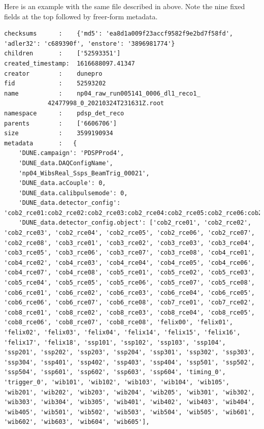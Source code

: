 \documentclass[../main-v1.tex]{subfiles}
\begin{document}
Here is an example with the same file described in  above. Note the nine fixed fields at the top followed by freer-form metadata. 

\begin{verbatim}
checksums      :    {'md5': 'ea8d1a009f23accf9582f9e2bd7f58fd', 'adler32': 'c689390f', 'enstore': '3896981774'}
children       :    ['52593351']
created_timestamp:  1616688097.41347
creator        :    dunepro
fid            :    52593202
name           :    np04_raw_run005141_0006_dl1_reco1_
            42477998_0_20210324T231631Z.root
namespace      :    pdsp_det_reco
parents        :    ['6606706']
size           :    3599190934
metadata       :   {
    'DUNE.campaign': 'PDSPProd4',
    'DUNE_data.DAQConfigName',
    'np04_WibsReal_Ssps_BeamTrig_00021',
    'DUNE_data.acCouple': 0,
    'DUNE_data.calibpulsemode': 0,
    'DUNE_data.detector_config': 'cob2_rce01:cob2_rce02:cob2_rce03:cob2_rce04:cob2_rce05:cob2_rce06:cob2_rce07:cob2_rce08:cob3_rce01:cob3_rce02:cob3_rce03:cob3_rce04:cob3_rce05:cob3_rce06:cob3_rce07:cob3_rce08:cob4_rce01:cob4_rce02:cob4_rce03:cob4_rce04:cob4_rce05:cob4_rce06:cob4_rce07:cob4_rce08:cob5_rce01:cob5_rce02:cob5_rce03:cob5_rce04:cob5_rce05:cob5_rce06:cob5_rce07:cob5_rce08:cob6_rce01:cob6_rce02:cob6_rce03:cob6_rce04:cob6_rce05:cob6_rce06:cob6_rce07:cob6_rce08:cob7_rce01:cob7_rce02:cob8_rce01:cob8_rce02:cob8_rce03:cob8_rce04:cob8_rce05:cob8_rce06:cob8_rce07:cob8_rce08:felix00:felix01:felix02:felix03:felix04:felix14:felix15:felix16:felix17:felix18:ssp101:ssp102:ssp103:ssp104:ssp201:ssp202:ssp203:ssp204:ssp301:ssp302:ssp303:ssp304:ssp401:ssp402:ssp403:ssp404:ssp501:ssp502:ssp504:ssp601:ssp602:ssp603:ssp604:timing_0:trigger_0:wib101:wib102:wib103:wib104:wib105:wib201:wib202:wib203:wib204:wib205:wib301:wib302:wib303:wib304:wib305:wib401:wib402:wib403:wib404:wib405:wib501:wib502:wib503:wib504:wib505:wib601:wib602:wib603:wib604:wib605',
    'DUNE_data.detector_config.object': ['cob2_rce01', 'cob2_rce02', 'cob2_rce03', 'cob2_rce04', 'cob2_rce05', 'cob2_rce06', 'cob2_rce07', 'cob2_rce08', 'cob3_rce01', 'cob3_rce02', 'cob3_rce03', 'cob3_rce04', 'cob3_rce05', 'cob3_rce06', 'cob3_rce07', 'cob3_rce08', 'cob4_rce01', 'cob4_rce02', 'cob4_rce03', 'cob4_rce04', 'cob4_rce05', 'cob4_rce06', 'cob4_rce07', 'cob4_rce08', 'cob5_rce01', 'cob5_rce02', 'cob5_rce03', 'cob5_rce04', 'cob5_rce05', 'cob5_rce06', 'cob5_rce07', 'cob5_rce08', 'cob6_rce01', 'cob6_rce02', 'cob6_rce03', 'cob6_rce04', 'cob6_rce05', 'cob6_rce06', 'cob6_rce07', 'cob6_rce08', 'cob7_rce01', 'cob7_rce02', 'cob8_rce01', 'cob8_rce02', 'cob8_rce03', 'cob8_rce04', 'cob8_rce05', 'cob8_rce06', 'cob8_rce07', 'cob8_rce08', 'felix00', 'felix01', 'felix02', 'felix03', 'felix04', 'felix14', 'felix15', 'felix16', 'felix17', 'felix18', 'ssp101', 'ssp102', 'ssp103', 'ssp104', 'ssp201', 'ssp202', 'ssp203', 'ssp204', 'ssp301', 'ssp302', 'ssp303', 'ssp304', 'ssp401', 'ssp402', 'ssp403', 'ssp404', 'ssp501', 'ssp502', 'ssp504', 'ssp601', 'ssp602', 'ssp603', 'ssp604', 'timing_0', 'trigger_0', 'wib101', 'wib102', 'wib103', 'wib104', 'wib105', 'wib201', 'wib202', 'wib203', 'wib204', 'wib205', 'wib301', 'wib302', 'wib303', 'wib304', 'wib305', 'wib401', 'wib402', 'wib403', 'wib404', 'wib405', 'wib501', 'wib502', 'wib503', 'wib504', 'wib505', 'wib601', 'wib602', 'wib603', 'wib604', 'wib605'],

\end{verbatim}
\end{document}
